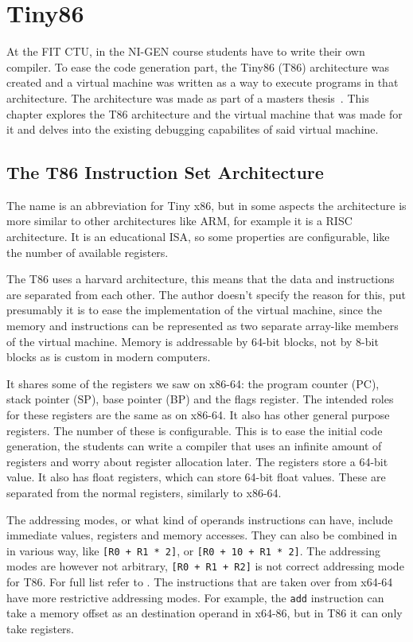 \chapter{Tiny86}\label{section:T86}
At the FIT CTU, in the NI-GEN course students have to write their own compiler.
To ease the code generation part, the Tiny86 (T86) architecture was created and
a virtual machine was written as a way to execute programs in that
architecture. The architecture was made as part of a masters
thesis~\cite{ivo2021tiny}. This chapter explores the T86 architecture and the
virtual machine that was made for it and delves into the existing debugging
capabilites of said virtual machine.

\section{The T86 Instruction Set Architecture}
The name is an abbreviation for Tiny x86, but in some aspects the architecture
is more similar to other architectures like ARM, for example it is a RISC
architecture. It is an educational ISA, so some properties are configurable,
like the number of available registers.

The T86 uses a harvard architecture, this means that the data and instructions
are separated from each other. The author doesn't specify the reason for this,
put presumably it is to ease the implementation of the virtual machine, since
the memory and instructions can be represented as two separate array-like
members of the virtual machine. Memory is addressable by 64-bit blocks, not
by 8-bit blocks as is custom in modern computers.

It shares some of the registers we saw on x86-64: the program counter (PC),
stack pointer (SP), base pointer (BP) and the flags register. The intended
roles for these registers are the same as on x86-64. It also has other general
purpose registers. The number of these is configurable. This is to ease the
initial code generation, the students can write a compiler that uses an
infinite amount of registers and worry about register allocation later. The
registers store a 64-bit value. It also has float registers, which can store
64-bit float values. These are separated from the normal registers, similarly
to x86-64.

The addressing modes, or what kind of operands instructions can have, include
immediate values, registers and memory accesses. They can also be combined in
in various way, like \texttt{[R0 + R1 * 2]}, or \texttt{[R0 + 10 + R1 * 2]}.
The addressing modes are however not arbitrary, \texttt{[R0 + R1 + R2]} is not
correct addressing mode for T86. For full list refer to \cite{ivo2021tiny}. The
instructions that are taken over from x64-64 have more restrictive addressing
modes. For example, the \verb|add| instruction can take a memory offset as an
destination operand in x64-86, but in T86 it can only take registers.

